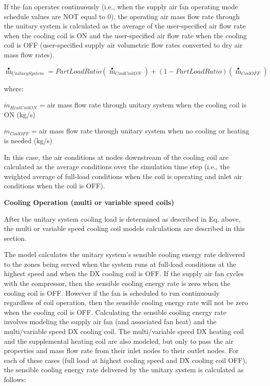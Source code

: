 If the fan operates continuously (i.e., when the supply air fan operating mode schedule values are NOT equal to 0), the operating air mass flow rate through the unitary system is calculated as the average of the user-specified air flow rate when the cooling coil is ON and the user-specified air flow rate when the cooling coil is OFF (user-specified supply air volumetric flow rates converted to dry air mass flow rates).

\begin{equation}
{{\mathop m\limits^ \bullet  }_{UnitarySystem}} = PartLoadRatio\left( {{{\mathop m\limits^ \bullet  }_{CoolCoilON}}} \right) + \left( {1 - PartLoadRatio} \right)\left( {{{\mathop m\limits^ \bullet  }_{CoilOFF}}} \right)
\end{equation}

where: 

$\dot{m}_{HeatCoilON}$ = air mass flow rate through unitary system when the cooling coil is ON (kg/s)

$\dot{m}_{CoilOFF}$ = air mass flow rate through unitary system when no cooling or heating is needed (kg/s)

In this case, the air conditions at nodes downstream of the cooling coil are calculated as the average conditions over the simulation time step (i.e., the weighted average of full-load conditions when the coil is operating and inlet air conditions when the coil is OFF).

\textbf{Cooling Operation (multi or variable speed coils)}

After the unitary system cooling load is determined as described in Eq. above, the multi or variable speed cooling coil models calculations are described in this section.

The model calculates the unitary system's sensible cooling energy rate delivered to the zones being served when the system runs at full-load conditions at the highest speed and when the DX cooling coil is OFF. If the supply air fan cycles with the compressor, then the sensible cooling energy rate is zero when the cooling coil is OFF. However if the fan is scheduled to run continuously regardless of coil operation, then the sensible cooling energy rate will not be zero when the cooling coil is OFF. Calculating the sensible cooling energy rate involves modeling the supply air fan (and associated fan heat) and the multi/variable speed DX cooling coil. The multi/variable speed DX heating coil and the supplemental heating coil are also modeled, but only to pass the air properties and mass flow rate from their inlet nodes to their outlet nodes. For each of these cases (full load at highest cooling speed and DX cooling coil OFF), the sensible cooling energy rate delivered by the unitary system is calculated as follows:


